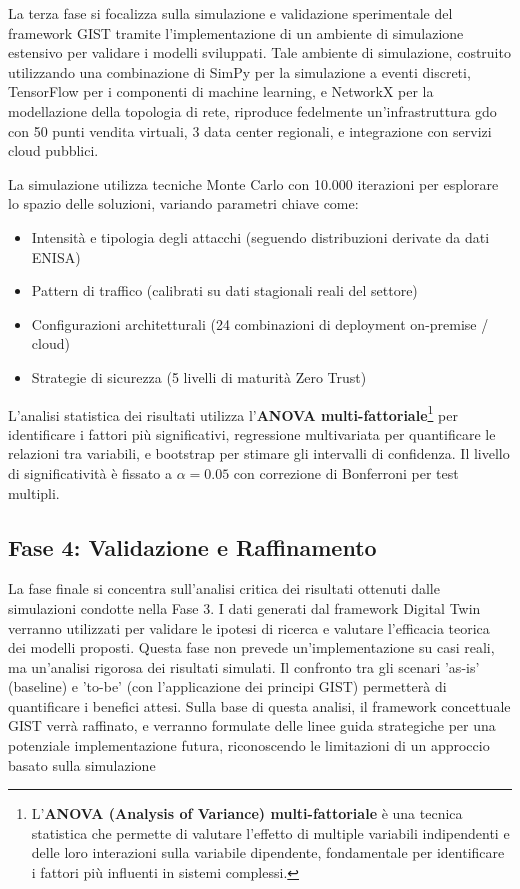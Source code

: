 \label{ssec:fase3}
La terza fase si focalizza sulla simulazione e validazione sperimentale del framework GIST tramite l'implementazione di un ambiente di simulazione estensivo per validare i modelli sviluppati. Tale ambiente di simulazione, costruito utilizzando una combinazione di SimPy per la simulazione a eventi discreti, TensorFlow per i componenti di machine learning, e NetworkX per la modellazione della topologia di rete, riproduce fedelmente un'infrastruttura \gls{gdo} con 50 punti vendita virtuali, 3 data center regionali, e integrazione con servizi cloud pubblici.

La simulazione utilizza tecniche Monte Carlo con 10.000 iterazioni per esplorare lo spazio delle soluzioni, variando parametri chiave come:
\begin{itemize}
    \item Intensità e tipologia degli attacchi (seguendo distribuzioni derivate da dati ENISA)
    \item Pattern di traffico (calibrati su dati stagionali reali del settore)
    \item Configurazioni architetturali (24 combinazioni di deployment on-premise / cloud)
    \item Strategie di sicurezza (5 livelli di maturità Zero Trust)
\end{itemize}
L'analisi statistica dei risultati utilizza l'\textbf{ANOVA multi-fattoriale}\footnote{L'\textbf{ANOVA (Analysis of Variance) multi-fattoriale} è una tecnica statistica che permette di valutare l'effetto di multiple variabili indipendenti e delle loro interazioni sulla variabile dipendente, fondamentale per identificare i fattori più influenti in sistemi complessi.} per identificare i fattori più significativi, regressione multivariata per quantificare le relazioni tra variabili, e bootstrap per stimare gli intervalli di confidenza. Il livello di significatività è fissato a $\alpha = 0.05$ con correzione di Bonferroni per test multipli.

\subsection{Fase 4: Validazione e Raffinamento}

\label{ssec:fase4}
La fase finale si concentra sull'analisi critica dei risultati ottenuti dalle simulazioni condotte nella Fase 3. I dati generati dal framework Digital Twin verranno utilizzati per validare le ipotesi di ricerca e valutare l'efficacia teorica dei modelli proposti. Questa fase non prevede un'implementazione su casi reali, ma un'analisi rigorosa dei risultati simulati. Il confronto tra gli scenari 'as-is' (baseline) e 'to-be' (con l'applicazione dei principi GIST) permetterà di quantificare i benefici attesi. Sulla base di questa analisi, il framework concettuale GIST verrà raffinato, e verranno formulate delle linee guida strategiche per una potenziale implementazione futura, riconoscendo le limitazioni di un approccio basato sulla simulazione

